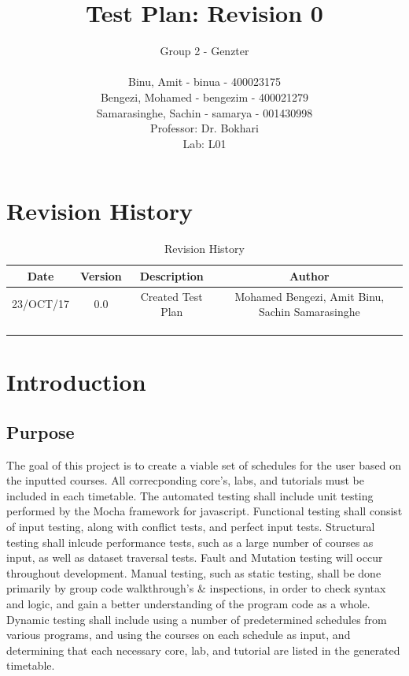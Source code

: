 \documentclass[11pt, oneside]{article}   	%
\title{Test Plan: Revision 0}
\author{Group 2 - Genzter \\
		\\ Binu, Amit - binua - 400023175
		\\ Bengezi, Mohamed - bengezim - 400021279
		\\ Samarasinghe, Sachin - samarya - 001430998
		\\Professor: Dr. Bokhari
		\\ Lab: L01}
\begin{document}
\maketitle

\newpage
\section{Revision History}

\begin{table}[h]
\begin{center}
\begin{tabular}{ | c | c | c | c | }
\hline
 Date & Version & Description & Author \\ 
\hline
 23/OCT/17 & 0.0 & Created Test Plan & Mohamed Bengezi, Amit Binu, Sachin Samarasinghe \\  
\hline
  & & & \\
\hline
 & & & \\
\hline 
 & & & \\ 
\hline 
\end{tabular}
\end{center}
\caption{Revision History}
\end{table}

\newpage
\tableofcontents
\listoffigures
\listoftables

\newpage
\section{Introduction}
\subsection{Purpose}
The goal of this project is to create a viable set of schedules for the user based on the inputted courses. All correcponding core's, labs, and tutorials must be included in each timetable. The automated testing shall include unit testing performed by the Mocha framework for javascript. Functional testing shall consist of input testing, along with conflict tests, and perfect input tests. Structural testing shall inlcude performance tests, such as a large number of courses as input, as well as dataset traversal tests. Fault and Mutation testing will occur throughout development. Manual testing, such as static testing, shall be done primarily by group code walkthrough's \& inspections, in order to check syntax and logic, and gain a better understanding of the program code as a whole. Dynamic testing shall include using a number of predetermined schedules from various programs, and using the courses on each schedule as input, and determining that each necessary core, lab, and tutorial are listed in the generated timetable. 
\end{document}

